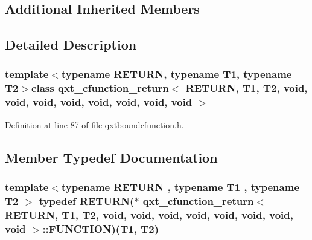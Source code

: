 \subsection*{Additional Inherited Members}


\subsection{Detailed Description}
\subsubsection*{template$<$typename R\-E\-T\-U\-R\-N, typename T1, typename T2$>$class qxt\-\_\-cfunction\-\_\-return$<$ R\-E\-T\-U\-R\-N, T1, T2, void, void, void, void, void, void, void, void $>$}



Definition at line 87 of file qxtboundcfunction.\-h.



\subsection{Member Typedef Documentation}
\hypertarget{classqxt__cfunction__return_3_01_r_e_t_u_r_n_00_01_t1_00_01_t2_00_01void_00_01void_00_01void_00_3960e918ee54767ca99e584f1e589c4c_afaa3cb2255e061bc197da31b96177457}{
\subsubsection[{F\-U\-N\-C\-T\-I\-O\-N}]{\setlength{\rightskip}{0pt plus 5cm}template$<$typename R\-E\-T\-U\-R\-N , typename T1 , typename T2 $>$ typedef R\-E\-T\-U\-R\-N($\ast$ {\bf qxt\-\_\-cfunction\-\_\-return}$<$ R\-E\-T\-U\-R\-N, T1, T2, {\bf void}, {\bf void}, {\bf void}, {\bf void}, {\bf void}, {\bf void}, {\bf void}, {\bf void} $>$\-::F\-U\-N\-C\-T\-I\-O\-N)(T1, T2)}}\label{classqxt__cfunction__return_3_01_r_e_t_u_r_n_00_01_t1_00_01_t2_00_01void_00_01void_00_01void_00_3960e918ee54767ca99e584f1e589c4c_afaa3cb2255e061bc197da31b96177457}


